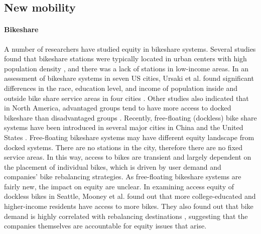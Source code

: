 \documentclass[11pt]{article}
\begin{document}
\subsection{New mobility}
\paragraph{Bikeshare} A number of researchers have studied equity in bikeshare systems. Several studies found that bikeshare stations were typically located in urban centers with high population density \cite{ogilvie2012inequalities, meng2018evaluation}, and there was a lack of stations in low-income areas. In an assessment of bikeshare systems in seven US cities, Ursaki et al. found significant differences in the race, education level, and income of population inside and outside bike share service areas in four cities \cite{ursaki2015quantifying}. Other studies also indicated that in North America, advantaged groups tend to have more access to docked bikeshare than disadvantaged groups \cite{smith2015exploring}.  Recently, free-floating (dockless) bike share systems have been introduced in several major cities in China and the United States \cite{li2018free, mooney2019freedom, xu2018station}. Free-floating bikeshare systems may have different equity landscape from docked systems. There are no stations in the city, therefore there are no fixed service areas. In this way, access to bikes are transient and largely dependent on the placement of individual bikes, which is driven by user demand and companies’ bike rebalancing strategies. As free-floating bikeshare systems are fairly new, the impact on equity are unclear. In examining access equity of dockless bikes in Seattle, Mooney et al. found out that more college-educated and higher-income residents have access to more bikes. They also found out that bike demand is highly correlated with rebalancing destinations \cite{mooney2019freedom}, suggesting that the companies themselves are accountable for equity issues that arise. 
\end{document}
